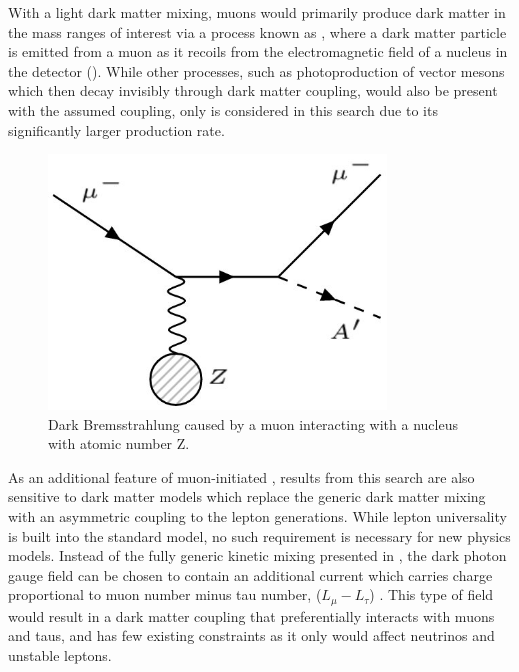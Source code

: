With a light dark matter mixing, muons would primarily produce dark matter in the mass ranges of interest via a process known as \dbrem, where a dark matter particle is emitted from a muon as it recoils from the electromagnetic field of a nucleus in the detector ().
While other processes, such as photoproduction of vector mesons which then decay invisibly through dark matter coupling, would also be present with the assumed coupling, only \dbrem is considered in this search due to its significantly larger production rate.

\begin{figure}[ht]
	\centering
	\label{fig:dbrem_feyn}
	\includegraphics[width=0.8\textwidth]{figures/dbrem_feyn_diagram.jpg}
        \caption[Dark Bremsstrahlung Feynman Diagram]{Dark Bremsstrahlung caused by a muon interacting with a nucleus with atomic number Z.}
\end{figure}

As an additional feature of muon-initiated \dbrem, results from this search are also sensitive to dark matter models which replace the generic dark matter mixing with an asymmetric coupling to the lepton generations.
While lepton universality is built into the standard model, no such requirement is necessary for new physics models. 
Instead of the fully generic kinetic mixing presented in , the dark photon gauge field can be chosen to contain an additional current which carries charge proportional to muon number minus tau number, ($L_\mu - L_\tau$) \cite{neut_trident}.
This type of field would result in a dark matter coupling that preferentially interacts with muons and taus, and has few existing constraints as it only would affect neutrinos and unstable leptons.

